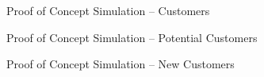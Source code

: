\begin{figure}[htb]
	\centering
	
	\caption{Proof of Concept Simulation -- Customers}
\end{figure}

\begin{figure}[htb]
	\centering
	
	\caption{Proof of Concept Simulation -- Potential Customers}
\end{figure}

\begin{figure}[htb]
	\centering
	
	\caption{Proof of Concept Simulation -- New Customers}
\end{figure}


